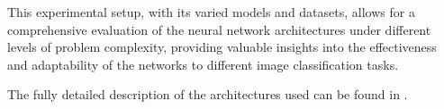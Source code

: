 This experimental setup, with its varied models and datasets, allows for a comprehensive evaluation of the neural network architectures under different levels of problem complexity, providing valuable insights into the effectiveness and adaptability of the networks to different image classification tasks.

The fully detailed description of the architectures used can be found in .

